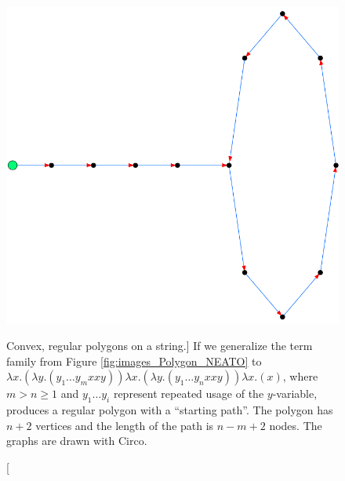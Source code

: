 \begin{figure}[htbp]
{		\includegraphics[height=\exampleheight]{../images/Ketcher96_CIRCO.png}
	}
	
	\caption
	[Convex, regular polygons on a string.]
	{If we generalize the term family from Figure \ref{fig:images_Polygon_NEATO} to 
	$\lambda x.(\lambda y.(y_1\hdots y_m x x y)) \lambda x.(\lambda y.(y_1\hdots y_n x x y)) \lambda x.(x)$,
	where $m>n\geq 1$ and $y_1\hdots y_i$ represent repeated usage of the $y$-variable, 
	produces a regular polygon with a ``starting path''. The polygon has $n+2$ vertices
	and the length of the path is $n-m+2$ nodes. The graphs are drawn with Circo.}
	\label{fig:images_Ketcher_CIRCO}
\end{figure}

